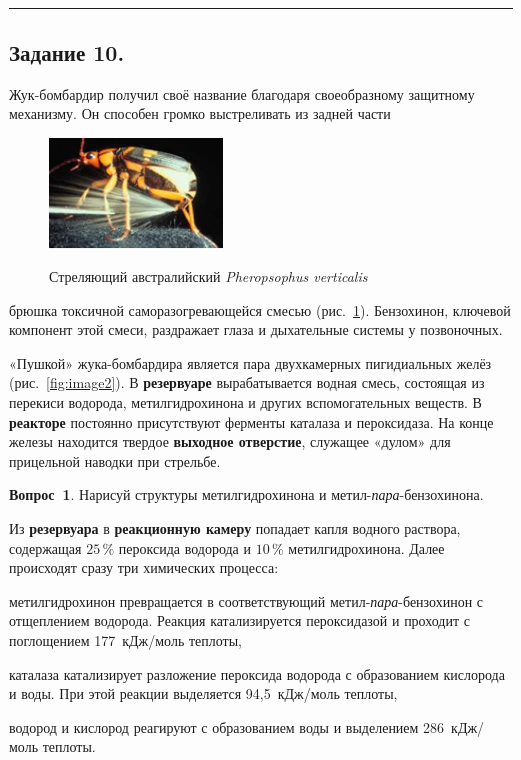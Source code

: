 \\
\rule[0.5\baselineskip]{\textwidth}{1pt}

\vspace{0\baselineskip}

\subsection*{Задание 10.}
Жук-бомбардир получил своё название благодаря своеобразному защитному механизму. Он способен громко выстреливать из задней части%
\setlength{\intextsep}{0.2pt} 
\setlength\columnsep{15.2pt}
\begin{figure}
{\includegraphics[width=4.6cm]{images/10-1.png}}
\caption{Стреляющий австралийский \textit{Pheropsophus verticalis}}\label{fig:chim1}
\end{figure}
брюшка токсичной саморазогревающейся смесью (рис.~\ref{fig:chim1}). Бензохинон, ключевой компонент этой смеси, раздражает глаза и дыхательные системы у позвоночных.

«Пушкой» жука-бомбардира является пара двухкамерных пигидиальных желёз (рис.~\ref{fig:image2}). В \textbf{резервуаре} вырабатывается водная смесь, состоящая из перекиси водорода, метилгидрохинона и других вспомогательных веществ. В \textbf{реакторе} постоянно присутствуют ферменты каталаза и пероксидаза. На конце железы находится твердое \textbf{выходное отверстие}, служащее «дулом» для прицельной наводки при стрельбе.

\mbox{\textbf{Вопрос 1}.} Нарисуй структуры метилгидрохинона и метил-\textit{пара}-бен\-зо\-хи\-но\-на.\vspace{1ex}
    
Из \textbf{резервуара} в \textbf{реакционную камеру} попадает капля водного раствора, содержащая $25\,\%$ пероксида водорода и $10\,\%$ метилгидрохинона. Далее происходят сразу три химических процесса:
\begin{list}{)}{\leftmargin=6mm  \topsep=0mm  \itemsep=0pt \parsep=0mm \itemindent=-1pt}
\item метилгидрохинон превращается в соответствующий метил-\textit{пара}-бен\-зо\-хи\-нон с отщеплением водорода. Реакция катализируется пероксидазой и проходит с поглощением 177~кДж/моль теплоты,
\item каталаза катализирует разложение пероксида водорода с образованием кислорода и воды. При этой реакции выделяется 94,5~кДж/моль теплоты,
\item водород и кислород реагируют с образованием воды и выделением 286~кДж/моль теплоты.
\end{list}

